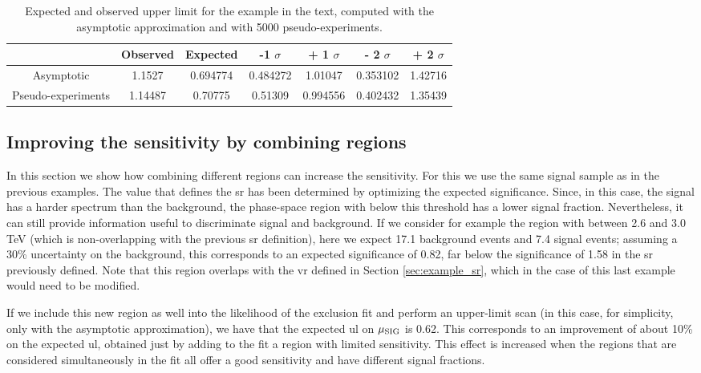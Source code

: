 \begin{table}
\centering
\begin{tabular}{|c|c|c|c|c|c|c|}
\hline 
 & Observed  & Expected &  -1 $\sigma$ & + 1 $\sigma$ & - 2 $\sigma$ &  + 2 $\sigma$ \\ 
\hline 
Asymptotic & 1.1527 & 0.694774 & 0.484272 & 1.01047 & 0.353102 & 1.42716 \\ 
\hline 
Pseudo-experiments & 1.14487 & 0.70775 & 0.51309 & 0.994556 & 0.402432 & 1.35439 \\ 
\hline 
\end{tabular} 
\caption{Expected and observed upper limit for the example in the text, computed with the asymptotic approximation and with 5000 pseudo-experiments.}
\label{tab:stat:exampleUL}
\end{table}



\subsection{Improving the sensitivity by combining regions}
\label{sec:example_combi}

In this section we show how combining different regions can increase the sensitivity. 
For this we use the same signal sample as in the previous examples. 
The \meff value that defines the \gls{sr} has been determined by optimizing the expected significance. 
Since, in this case, the signal has a harder \meff spectrum than the background, the phase-space region 
with \meff below this threshold has a lower signal fraction. Nevertheless, it can still provide information useful to
discriminate signal and background. If we consider for example the region with \meff between 2.6 and 3.0 TeV (which is non-overlapping with 
the previous \gls{sr} definition), here we expect 17.1 background events and 7.4 signal events;
assuming a 30\% uncertainty on the background, this corresponds to an expected significance of 0.82, far below the significance of 1.58 in the 
\gls{sr} previously defined. Note that this region overlaps with the \gls{vr} defined in Section \ref{sec:example_sr}, which in the case of this last example would need to be modified.

If we include this new region as well into the likelihood of the exclusion fit and perform an upper-limit scan (in this case, for simplicity, only with the asymptotic approximation), we have that the expected \gls{ul} on $\mu_{\rm SIG}$ is 0.62. This corresponds to an improvement of about 10\% on the expected \gls{ul}, obtained just by adding to the fit a region with limited sensitivity. This effect is increased when the regions that are considered simultaneously in the fit all offer a good sensitivity and have different signal fractions. 



